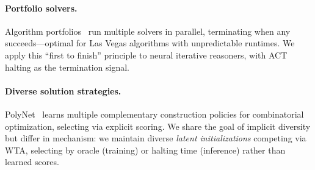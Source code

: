 
\paragraph{Portfolio solvers.}
Algorithm portfolios~\citep{gomes2001satportfolio, luby1993optimal} run multiple
solvers in parallel, terminating when any succeeds---optimal for Las Vegas
algorithms with unpredictable runtimes. We apply this ``first to finish''
principle to neural iterative reasoners, with ACT halting as the termination
signal.


\paragraph{Diverse solution strategies.}
PolyNet~\citep{hottung2025polynet} learns multiple complementary construction
policies for combinatorial optimization, selecting via explicit scoring. We
share the goal of implicit diversity but differ in mechanism: we maintain
diverse \emph{latent initializations} competing via WTA, selecting by oracle
(training) or halting time (inference) rather than learned scores.

